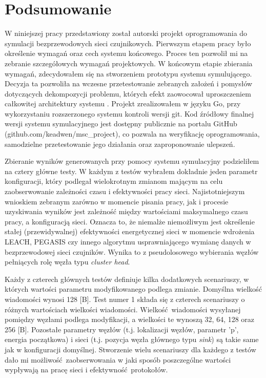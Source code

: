 \documentclass[a4paper,12pt,twoside,openany]{report}
\begin{document}
\chapter{Podsumowanie}
W niniejszej pracy przedstawiony został autorski projekt oprogramowania do symulacji bezprzewodowych sieci czujnikowych. 
Pierwszym etapem pracy było określenie wymagań oraz cech systemu końcowego.
Proces ten pozwolił mi na zebranie szczegółowych wymagań projektowych. W końcowym etapie zbierania wymagań, zdecydowałem się na stworzeniem prototypu systemu symulującego.
Decyzja ta pozwoliła na wczesne przetestowanie zebranych założeń i pomysłów dotyczących dekompozycji problemu, których efekt zaowocował uproszczeniem całkowitej architektury systemu \cite{SoftwareDesingBook}.
Projekt zrealizowałem w języku Go, przy wykorzystaniu rozszerzonego systemu kontroli wersji git. 
Kod źródłowy finalnej wersji systemu symulacyjnego jest dostępny publicznie na portalu GitHub (github.com/keadwen/msc\_project), co pozwala na weryfikację oprogramowania, samodzielne przetestowanie jego działania oraz zaproponowanie ulepszeń.

Zbieranie wyników generowanych przy pomocy systemu symulacyjny podzieliłem na cztery główne testy.
W każdym z testów wybrałem dokładnie jeden parametr konfiguracji, który podlegał wielokrotnym zmianom mającym na celu zaobserwowanie zależności czasu i efektywności pracy sieci.
Najistotniejszym wnioskiem zebranym zarówno w momencie pisania pracy, jak i procesie uzyskiwania wyników jest zależność między wartościami maksymalnego czasu pracy, a konfiguracją sieci.
Oznacza to, że niemalże niemożliwym jest określenie stałej (przewidywalnej) efektywności energetycznej sieci w momencie wdrożenia LEACH, PEGASIS czy innego algorytmu usprawniającego
wymianę danych w bezprzewodowej sieci czujników. Wynika to z pseudolosowego wybierania węzłów pełniących rolę węzła typu \textit{cluster head}.

Każdy z czterech głównych testów definiuje kilka dodatkowych scenariuszy, w których wartości parametru modyfikowanego podlega zmianie. 
Domyślna wielkość wiadomości wynosi 128 [B]. Test numer 1 składa się z czterech scenariuszy o różnych wartościach wielkości wiadomości. 
Wielkość wiadomości wysyłanej pomiędzy węzłami podlega modyfikacji, a wielkości te wynoszą 32, 64, 128 oraz 256 [B].
Pozostałe parametry węzłów (t.j. lokalizacji węzłów, parametr 'p', energia początkowa) i sieci (t.j. pozycja węzła głównego typu \textit{sink}) są takie same jak w konfiguracji domyślnej.
Stworzenie wielu scenariuszy dla każdego z testów dało mi możliwość zaobserwowania w jaki sposób poszczególne wartości wypływają na pracę sieci i efektywność protokołów.
\end{document}
